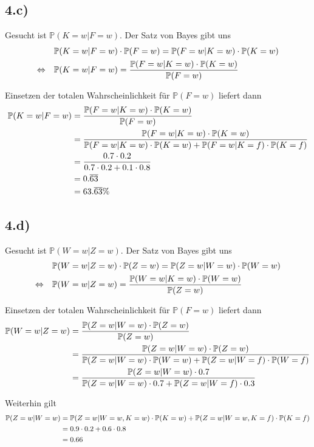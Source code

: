\documentclass[a4paper]{article}
\newcommand{\IP}{\mathbb{P}}
\begin{document}
\subsection*{4.c)}
Gesucht ist $\IP(K=w|F=w)$. Der Satz von Bayes gibt uns
\begin{align}
	                       & \IP(K=w|F=w) \cdot \IP(F=w) = \IP(F=w|K=w) \cdot \IP(K=w) \notag \\
	 \Leftrightarrow \quad & \IP(K=w|F=w) = \frac{\IP(F=w|K=w) \cdot \IP(K=w)}{\IP(F=w)} \notag
\end{align}

Einsetzen der totalen Wahrscheinlichkeit f\"ur $\IP(F=w)$ liefert dann
\begin{align}
	\IP(K=w|F=w) &= \frac{\IP(F=w|K=w) \cdot \IP(K=w)}{\IP(F=w)} \notag \\
							 &= \frac{\IP(F=w|K=w) \cdot \IP(K=w)}{\IP(F=w|K=w) \cdot \IP(K=w) + \IP(F=w|K=f) \cdot \IP(K=f)} \notag \\
							 &= \frac{0.7 \cdot 0.2}{0.7 \cdot 0.2 + 0.1 \cdot 0.8} \notag \\
							 &= 0.\overline{63} \notag \\
							 &= 63.\overline{63}\% \notag
\end{align}

\subsection*{4.d)}
Gesucht ist $\IP(W=w|Z=w)$. Der Satz von Bayes gibt uns
\begin{align}
	                       & \IP(W=w|Z=w) \cdot \IP(Z=w) = \IP(Z=w|W=w) \cdot \IP(W=w) \notag \\
	 \Leftrightarrow \quad & \IP(W=w|Z=w) = \frac{\IP(W=w|K=w) \cdot \IP(W=w)}{\IP(Z=w)} \notag
\end{align}

Einsetzen der totalen Wahrscheinlichkeit f\"ur $\IP(F=w)$ liefert dann
\begin{align}
	\IP(W=w|Z=w) &= \frac{\IP(Z=w|W=w) \cdot \IP(Z=w)}{\IP(Z=w)} \notag \\
							 &= \frac{\IP(Z=w|W=w) \cdot \IP(Z=w)}{\IP(Z=w|W=w) \cdot \IP(W=w) + \IP(Z=w|W=f) \cdot \IP(W=f)} \notag \\
							 &= \frac{\IP(Z=w|W=w) \cdot 0.7}{\IP(Z=w|W=w) \cdot 0.7 + \IP(Z=w|W=f) \cdot 0.3} \notag
\end{align}

Weiterhin gilt
\begin{align}
	\IP(Z=w|W=w) &= \IP(Z=w|W=w,K=w) \cdot \IP(K=w) + \IP(Z=w|W=w,K=f) \cdot \IP(K=f) \notag \\
							 &= 0.9 \cdot 0.2 + 0.6 \cdot 0.8 \notag \\
							 &= 0.66 \notag
\end{align}
\end{document}
